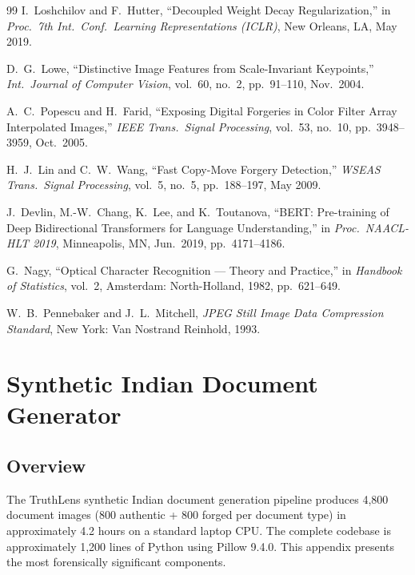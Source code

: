 \documentclass[12pt,a4paper,oneside]{report}
\begin{document}
\begin{thebibliography}{99}
I.~Loshchilov and F.~Hutter,
``Decoupled Weight Decay Regularization,''
in \textit{Proc.\ 7th Int.\ Conf.\ Learning Representations (ICLR)},
New Orleans, LA, May 2019.

D.~G.~Lowe,
``Distinctive Image Features from Scale-Invariant Keypoints,''
\textit{Int.\ Journal of Computer Vision},
vol.~60, no.~2, pp.~91--110, Nov.\ 2004.

A.~C.~Popescu and H.~Farid,
``Exposing Digital Forgeries in Color Filter Array Interpolated Images,''
\textit{IEEE Trans.\ Signal Processing},
vol.~53, no.~10, pp.~3948--3959, Oct.\ 2005.

H.~J.~Lin and C.~W.~Wang,
``Fast Copy-Move Forgery Detection,''
\textit{WSEAS Trans.\ Signal Processing}, vol.~5, no.~5, pp.~188--197, May 2009.

J.~Devlin, M.-W.~Chang, K.~Lee, and K.~Toutanova,
``BERT: Pre-training of Deep Bidirectional Transformers for Language Understanding,''
in \textit{Proc.\ NAACL-HLT 2019}, Minneapolis, MN, Jun.\ 2019, pp.~4171--4186.

G.~Nagy,
``Optical Character Recognition --- Theory and Practice,''
in \textit{Handbook of Statistics}, vol.~2,
Amsterdam: North-Holland, 1982, pp.~621--649.

W.~B.~Pennebaker and J.~L.~Mitchell,
\textit{JPEG Still Image Data Compression Standard},
New York: Van Nostrand Reinhold, 1993.

\end{thebibliography}


\appendix

\chapter{Synthetic Indian Document Generator}
\label{app:generator}

\section{Overview}

The TruthLens synthetic Indian document generation pipeline produces
4,800 document images (800 authentic + 800 forged per document type)
in approximately 4.2 hours on a standard laptop CPU. The complete codebase
is approximately 1,200 lines of Python using Pillow 9.4.0. This appendix
presents the most forensically significant components.
\end{document}
